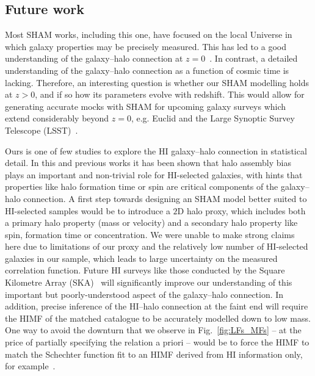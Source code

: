 \documentclass[usenatbib,useAMS]{mnras}
\newcommand{\HI}{\ensuremath{\mathrm{H}\scriptstyle\mathrm{I}}}
\begin{document}
\subsection{Future work}

Most \acl{SHAM} works, including this one, have focused on the local Universe in which galaxy properties may be precisely measured. This has led to a good understanding of the galaxy--halo connection at $z=0$~\citep{Wechsler_2018}. In contrast, a detailed understanding of the galaxy--halo connection as a function of cosmic time is lacking. Therefore, an interesting question is whether our \ac{SHAM} modelling holds at $z > 0$, and if so how its parameters evolve with redshift. This would allow for generating accurate mocks with \ac{SHAM} for upcoming galaxy surveys which extend considerably beyond $z=0$, e.g. Euclid and the Large Synoptic Survey Telescope (LSST)~\citep{Euclid, LSST}.

Ours is one of few studies to explore the $\HI$ galaxy--halo connection in statistical detail. In this and previous works it has been shown that halo assembly bias plays an important and non-trivial role for $\HI$-selected galaxies, with hints that properties like halo formation time or spin are critical components of the galaxy--halo connection. A first step towards designing an \ac{SHAM} model better suited to $\HI$-selected samples would be to introduce a $2\mathrm{D}$ halo proxy, which includes both a primary halo property (mass or velocity) and a secondary halo property like spin, formation time or concentration. We were unable to make strong claims here due to limitations of our proxy and the relatively low number of $\HI$-selected galaxies in our sample, which leads to large uncertainty on the measured correlation function. Future $\HI$ surveys like those conducted by the Square Kilometre Array (SKA)~\citep{SKA} will significantly improve our understanding of this important but poorly-understood aspect of the galaxy--halo connection. In addition, precise inference of the $\HI$--halo connection at the faint end will require the \ac{HIMF} of the matched catalogue to be accurately modelled down to low mass. One way to avoid the downturn that we observe in Fig.~\ref{fig:LFs_MFs} -- at the price of partially specifying the relation a priori -- would be to force the \ac{HIMF} to match the Schechter function fit to an \ac{HIMF} derived from $\HI$ information only, for example~\citet{Jones2018}.
\end{document}
